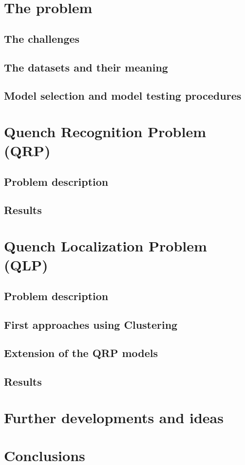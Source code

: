 \documentclass[a4paper]{book}
\begin{document}
\chapter{The problem}
\section{The challenges}
\section{The datasets and their meaning}
\section{Model selection and model testing procedures}
\chapter{Quench Recognition Problem (QRP)}
\section{Problem description}
\section{Results}
\chapter{Quench Localization Problem (QLP)}
\section{Problem description}
\section{First approaches using Clustering}
\section{Extension of the QRP models}
\section{Results}
\chapter{Further developments and ideas}
\chapter{Conclusions}
\end{document}
